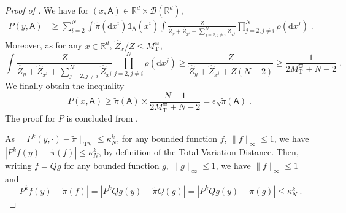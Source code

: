 \documentclass{article}
\def\transfo{\operatorname{T}}
\def\rmd{\operatorname{d}\hspace{-2pt}}
\def\rset{\mathbb{R}}
\def\rmd{\mathrm{d}}
\def\eqsp{\,}
\def\msa{\mathsf{A}}
\def\borel{\mathcal{B}}
\newcommand{\tvnorm}[1]{\| #1 \|_{\mathrm{TV}}}
\def\eqsp{\;}
\newcommand{\1}{\mathds{1}}
\newcommand{\indi}[1]{\1_{#1}}
\def\proposal{\rho}
\def\const{Z}
\newcommand{\estConstC}[1]{\widehat{Z}_{#1}}
\def\tpi{\tilde{\pi}}
\def\msa{\mathsf{A}}
\def\rset{\mathbb{R}}
\def\rmd{\mathrm{d}}
\def\bound{M_{\transfo}^{\varpi}}
\begin{document}
\begin{proof}[Proof of ]
  We have for $(x, \msa)\in\rset^d\times\borel(\rset^d)$,
  \begin{align*}
    P(y, \msa)
    &\geq\sum_{i=2}^N\int\tpi(\rmd x^i)\indi{\msa}(x^i)\int \frac{ \const}{\estConstC{y} +\estConstC{x^i} +\sum_{j=2, j\neq i}^N \estConstC{x^j}} \prod_{j=2, j\neq i}^N\proposal(\rmd x^j) \eqsp.
  \end{align*}
   Moreover, as for any $x\in\rset^d$, $\estConstC{x}/\const\leq\bound$,
  \begin{equation*}
  \label{eq:convex_trick_i-SIR}
    \int \frac{\const}{\estConstC{y} + \estConstC{x^i} +\sum_{j=2, j\neq i}^N \estConstC{x^j}} \prod_{j=2, j\neq i}^N\proposal(\rmd x^j)
     \geq \frac{\const}{\estConstC{y} + \estConstC{x^i} + \const(N-2)}\geq \frac{1}{2\bound + N-2}\eqsp.
  \end{equation*}
  We finally obtain the  inequality
  \begin{equation}
    P(x, \msa)\geq \tpi(\msa)\times \frac{N-1}{2\bound + N -2} =  \epsilon_N \tpi(\msa)\eqsp.
  \end{equation}
  The proof for $P$ is concluded from \cite[Theorem~18.2.4]{douc:moulines:priouret:2018}.

  As $\tvnorm{P^{k}(y, \cdot) - \tpi}\leq \kappa_N^k$, for any bounded function $f$, $\|f\|_\infty\leq 1$, we have
  $|P^{k}f(y)- \tpi(f)|\leq \kappa_N^k$, by definition of the Total Variation Distance.
  Then, writing $f = Qg$ for any bounded function $g$, $\|g\|_\infty\leq 1$, we have $\|f\|_\infty\leq 1$ and
  \begin{equation}
      |P^{k}f(y)- \tpi(f)| =|P^{k}Qg(y)- \tpi Q(g)| = |P^{k}Qg(y)- \pi(g)|  \leq \kappa_N^k\eqsp.
  \end{equation}
  \end{proof}
\end{document}
